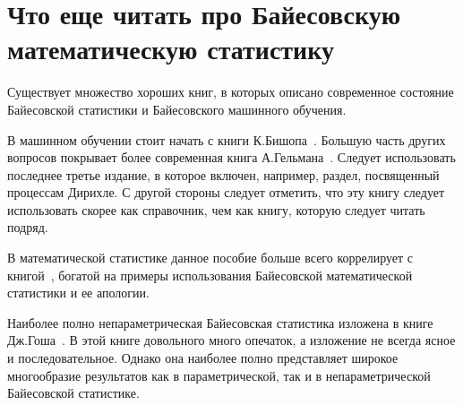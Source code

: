 \section{Что еще читать про Байесовскую математическую статистику}

Существует множество хороших книг, в которых описано современное состояние Байесовской статистики и Байесовского машинного обучения.

В машинном обучении стоит начать с книги К.Бишопа~\cite{bishop2006pattern}.
Большую часть других вопросов покрывает более современная книга А.Гельмана~\cite{gelman2014bayesian}. 
Следует использовать последнее третье издание, в которое включен, например, раздел, посвященный процессам Дирихле.
С другой стороны следует отметить, что эту книгу следует использовать скорее как справочник, чем как книгу, которую следует читать подряд.

В математической статистике данное пособие больше всего коррелирует с книгой~\cite{robert2007bayesian}, богатой на примеры использования Байесовской математической статистики и ее апологии.

Наиболее полно непараметрическая Байесовская статистика изложена в книге Дж.Гоша~\cite{ghosh2007bayesian}. 
В этой книге довольного много опечаток, а изложение не всегда ясное и последовательное.
Однако она наиболее полно представляет широкое многообразие результатов как в параметрической, так и в непараметрической Байесовской статистике.


